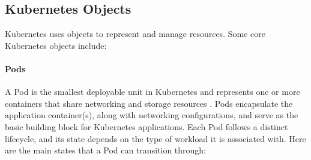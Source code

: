 \documentclass[main.tex]{subfiles}
\begin{document}
\subsection{Kubernetes Objects}
Kubernetes uses objects to represent and manage resources. Some core Kubernetes objects include:

\paragraph{Pods}
A Pod is the smallest deployable unit in Kubernetes and represents one or more containers that share networking and storage resources \cite{kubernetes-pods}. Pods encapsulate the application container(s), along with networking configurations, and serve as the basic building block for Kubernetes applications. Each Pod follows a distinct lifecycle, and its state depends on the type of workload it is associated with. Here are the main states that a Pod can transition through:
\end{document}
